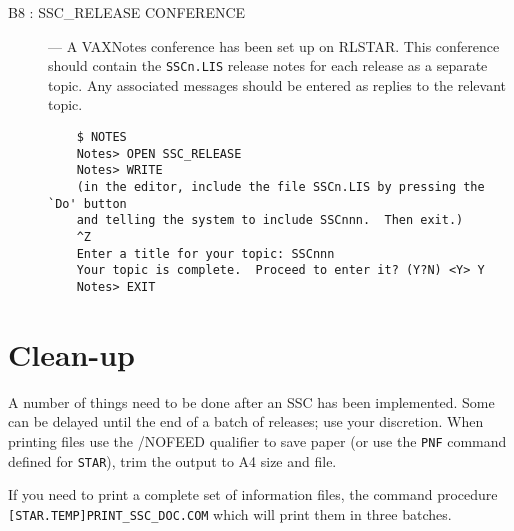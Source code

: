 \begin{description}
\item [B8 : SSC\_RELEASE CONFERENCE] --- A VAXNotes conference has been set up
on RLSTAR. This conference should contain the {\tt SSCn.LIS} release notes for
each release as a separate topic.
Any associated messages should be entered as replies to the relevant topic.

\begin{verbatim}
    $ NOTES
    Notes> OPEN SSC_RELEASE
    Notes> WRITE
    (in the editor, include the file SSCn.LIS by pressing the `Do' button
    and telling the system to include SSCnnn.  Then exit.)
    ^Z
    Enter a title for your topic: SSCnnn
    Your topic is complete.  Proceed to enter it? (Y?N) <Y> Y
    Notes> EXIT
\end{verbatim}

\end{description}

\section {Clean-up}

A number of things need to be done after an SSC has been implemented.
Some can be delayed until the end of a batch of releases; use your discretion.
When printing files use the /NOFEED qualifier to save paper (or use the 
{\tt PNF} command defined for {\tt STAR}), trim the output to A4 size and file.

If you need to print a complete set of information files, the command
procedure {\tt [STAR.TEMP]\-PRINT\_SSC\_DOC.COM} which will print them in three
batches. 

